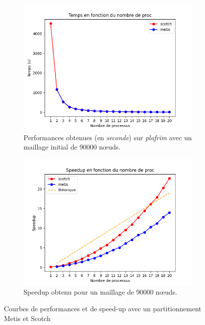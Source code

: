 \documentclass[a4paper,11pt]{article}
\begin{document}
\begin{figure}[H]
	\centering
	\begin{subfigure}{.45\textwidth}
		\centering
		\includegraphics[width=.9\linewidth]{figures/temps_maillage_90000.png}
		\caption{Performances obtenues (en \textit{seconde}) sur \textit{plafrim} avec un maillage initial de 90000 n\oe uds.}
		\label{fig:perf_maillage_90000}
	\end{subfigure}    
	\hfill
	\begin{subfigure}{.45\textwidth}
		\centering
		\includegraphics[width=.9\linewidth]{figures/speedup_maillage_90000.png}
		\caption{Speedup obtenu pour un maillage de 90000 n\oe uds.}
		\label{fig:speed_up_maillage_90000}
	\end{subfigure}
	
	\caption{Courbes de performances et de speed-up avec un partitionnement Metis et Scotch}
	\label{fig:perf_speedup_maillage_90000}
\end{figure}
\end{document}
